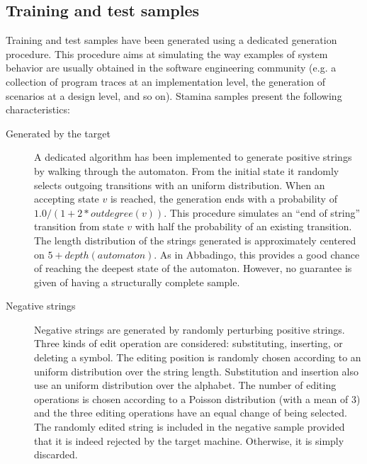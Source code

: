 \subsection{Training and test samples\label{subsection:stamina-samples}}

Training and test samples have been generated using a dedicated generation procedure. This procedure aims at simulating the way examples of system behavior are usually obtained in the software engineering community (e.g. a collection of program traces at an implementation level, the generation of scenarios at a design level, and so on). Stamina samples present the following characteristics:

\begin{description}

\item[Generated by the target] A dedicated algorithm has been implemented to generate positive strings by walking through the automaton. From the initial state it randomly selects outgoing transitions with an uniform distribution. When an accepting state $v$ is reached, the generation ends with a probability of $1.0/(1 + 2*outdegree(v))$. This procedure simulates an ``end of string'' transition from state $v$ with half the probability of an existing transition. The length distribution of the strings generated is approximately centered on $5 + depth(automaton)$. As in Abbadingo, this provides a good chance of reaching the deepest state of the automaton. However, no guarantee is given of having a structurally complete sample.

\item[Negative strings] Negative strings are generated by randomly perturbing positive strings. Three kinds of edit operation are considered: substituting, inserting, or deleting a symbol. The editing position is randomly chosen according to an uniform distribution over the string length. Substitution and insertion also use an uniform distribution over the alphabet. The number of editing operations is chosen according to a Poisson distribution (with a mean of 3) and the three editing operations have an equal change of being selected. The randomly edited string is included in the negative sample provided that it is indeed rejected by the target machine. Otherwise, it is simply discarded.

\end{description}

